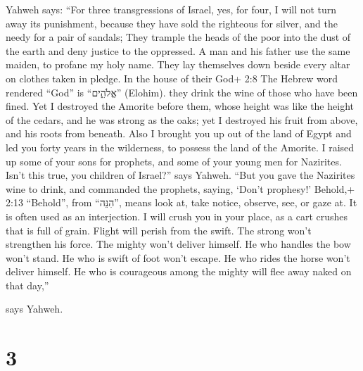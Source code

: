  Yahweh says: ``For three transgressions of Israel, yes, for
four, I will not turn away its punishment, because they have sold the
righteous for silver, and the needy for a pair of sandals; 
They trample the heads of the poor into the dust of the earth and deny
justice to the oppressed. A man and his father use the same maiden, to
profane my holy name.  They lay themselves down beside every
altar on clothes taken in pledge. In the house of their God+ 2:8 The
Hebrew word rendered ``God'' is ``אֱלֹהִ֑ים'' (Elohim). they drink the
wine of those who have been fined.  Yet I destroyed the
Amorite before them, whose height was like the height of the cedars, and
he was strong as the oaks; yet I destroyed his fruit from above, and his
roots from beneath.  Also I brought you up out of the land
of Egypt and led you forty years in the wilderness, to possess the land
of the Amorite.  I raised up some of your sons for
prophets, and some of your young men for Nazirites. Isn't this true, you
children of Israel?'' says Yahweh.  ``But you gave the
Nazirites wine to drink, and commanded the prophets, saying, `Don't
prophesy!'  Behold,+ 2:13 ``Behold'', from ``הִנֵּה'',
means look at, take notice, observe, see, or gaze at. It is often used
as an interjection. I will crush you in your place, as a cart crushes
that is full of grain.  Flight will perish from the swift.
The strong won't strengthen his force. The mighty won't deliver himself.
 He who handles the bow won't stand. He who is swift of
foot won't escape. He who rides the horse won't deliver himself.
 He who is courageous among the mighty will flee away naked
on that day,''

says Yahweh.

\hypertarget{section-2}{%
\section{3}\label{section-2}}

